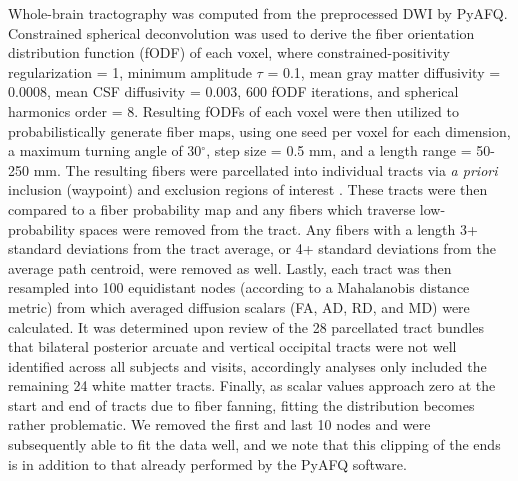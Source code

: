 \documentclass[12pt]{article}
\begin{document}
Whole-brain tractography was computed from the preprocessed DWI by PyAFQ. Constrained spherical deconvolution was used to derive the fiber orientation distribution function (fODF) of each voxel, where constrained-positivity regularization = 1, minimum amplitude $\tau$ = 0.1, mean gray matter diffusivity = 0.0008, mean CSF diffusivity = 0.003, 600 fODF iterations, and spherical harmonics order = 8. Resulting fODFs of each voxel were then utilized to probabilistically generate fiber maps, using one seed per voxel for each dimension, a maximum turning angle of 30$^\circ$, step size = 0.5 mm, and a length range = 50-250 mm. The resulting fibers were parcellated into individual tracts via \textit{a priori} inclusion (waypoint) and exclusion regions of interest \parencite{wakana2007ReproducibilityQuantitativeTractography}. These tracts were then compared to a fiber probability map \parencite{hua2008TractProbabilityMaps} and any fibers which traverse low-probability spaces were removed from the tract. Any fibers with a length 3+ standard deviations from the tract average, or 4+ standard deviations from the average path centroid, were removed as well. Lastly, each tract was then resampled into 100 equidistant nodes (according to a Mahalanobis distance metric) from which averaged diffusion scalars (FA, AD, RD, and MD) were calculated. It was determined upon review of the 28 parcellated tract bundles that bilateral posterior arcuate and vertical occipital tracts were not well identified across all subjects and visits, accordingly analyses only included the remaining 24 white matter tracts. Finally, as scalar values approach zero at the start and end of tracts due to fiber fanning, fitting the distribution becomes rather problematic. We removed the first and last 10 nodes and were subsequently able to fit the data well, and we note that this clipping of the ends is in addition to that already performed by the PyAFQ software.
\end{document}
